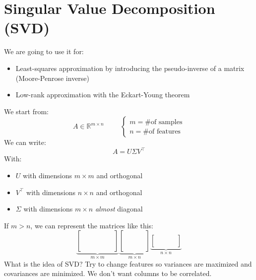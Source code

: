 \section{Singular Value Decomposition (SVD)}
We are going to use it for:
\begin{itemize}
    \item Least-squares approximation by introducing the pseudo-inverse of a matrix (Moore-Penrose inverse)
    \item Low-rank approximation with the Eckart-Young theorem
\end{itemize}
We start from:
\[
A \in \mathbb{R}^{m \times n} \hspace{1cm} 
\begin{cases}
m = \text{\# of samples}\\
n = \text{\# of features}
\end{cases}    
\]
We can write:
\[
    A = U\Sigma V^\intercal    
\]
With:
\begin{itemize}
    \item $U$ with dimensions $m \times m$ and orthogonal
    \item $V^\intercal$ with dimensions $n \times n$ and orthogonal
    \item $\Sigma$ with dimensions $m \times n$ \textit{almost} diagonal
\end{itemize}
If $m > n$, we can represent the matrices like this:
\[
\underbrace{
  \begin{bmatrix}
    & & & & & \\
    & & & & & \\
    & & & & & \\
    & & & & & \\
    & & & & & \\
  \end{bmatrix}}_{m \times m}
\underbrace{
  \begin{bmatrix}
    & & & \\
    & & & \\
    & & & \\
    & & & \\
    & & & \\
  \end{bmatrix}}_{m \times n}
\underbrace{
  \begin{bmatrix}
    & & & \\
    & & & \\
    & & & \\
  \end{bmatrix}}_{n \times n}
\]
What is the idea of SVD? Try to change features so variances are maximized and covariances are minimized. We don't want columns to be correlated.\\


